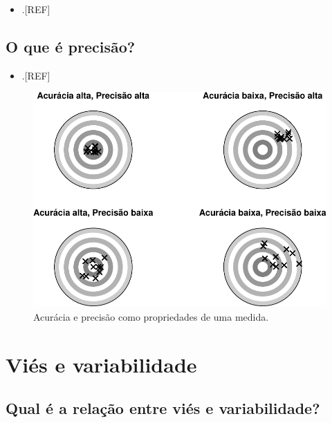 \documentclass[
  a4paper,
]{book}
\providecommand{\tightlist}{%
  \setlength{\itemsep}{0pt}\setlength{\parskip}{0pt}}
\begin{document}
\begin{itemize}
\tightlist
\item
  .{[}REF{]}
\end{itemize}

\hypertarget{o-que-uxe9-precisuxe3o}{%
\subsection{O que é precisão?}\label{o-que-uxe9-precisuxe3o}}

\begin{itemize}
\tightlist
\item
  .{[}REF{]}
\end{itemize}

\begin{figure}

{\centering \includegraphics{Ciencia-com-R_files/figure-latex/acuracia-precisao-1} 

}

\caption{Acurácia e precisão como propriedades de uma medida.}\label{fig:acuracia-precisao}
\end{figure}

\hypertarget{vies-variabilidade}{%
\section{Viés e variabilidade}\label{vies-variabilidade}}

\hypertarget{qual-uxe9-a-relauxe7uxe3o-entre-viuxe9s-e-variabilidade}{%
\subsection{Qual é a relação entre viés e variabilidade?}\label{qual-uxe9-a-relauxe7uxe3o-entre-viuxe9s-e-variabilidade}}
\end{document}
